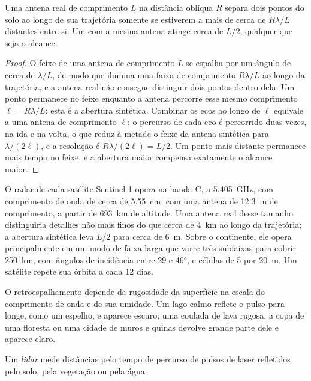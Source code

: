 \begin{proposition}\label{prop:b3:remote-sensing-gis:azimuth}
Uma antena real de comprimento $L$ na distância oblíqua $R$ separa dois pontos do
solo ao longo de sua trajetória somente se estiverem a mais de cerca de $R\lambda/L$
distantes entre si. Um  com a mesma antena atinge cerca de $L/2$,
qualquer que seja o alcance.
\end{proposition}

\begin{proof}
O feixe de uma antena de comprimento $L$ se espalha por um ângulo de cerca de
$\lambda/L$, de modo que ilumina uma faixa de comprimento $R\lambda/L$ ao longo da trajetória, e
a antena real não consegue distinguir dois pontos dentro dela. Um ponto permanece
no feixe enquanto a antena percorre esse mesmo comprimento $\ell = R\lambda/L$:
esta é a abertura sintética. Combinar os ecos ao longo de $\ell$ equivale
a uma antena de comprimento $\ell$; o percurso de cada eco é
percorrido duas vezes, na ida e na volta, o que reduz à metade o feixe da
antena sintética para $\lambda/(2\ell)$, e a resolução é $R\lambda/(2\ell) =
L/2$. Um ponto mais distante permanece mais tempo no feixe, e a abertura maior
compensa exatamente o alcance maior.
\end{proof}

O radar de cada satélite Sentinel-1 opera na banda C, a
\qty{5.405}{GHz}, com comprimento de onda de cerca de \qty{5.55}{cm}, com uma antena
de \qty{12.3}{m} de comprimento, a partir de \qty{693}{km} de altitude. Uma antena real desse tamanho distinguiria
detalhes não mais finos do que cerca de \qty{4}{km} ao longo da trajetória; a abertura sintética
leva $L/2$ para cerca de \qty{6}{m}. Sobre o continente, ele opera principalmente em um
modo de faixa larga que varre três subfaixas para cobrir \qty{250}{km}, com
ângulos de incidência entre 29 e \ang{46}, e células de 5 por \qty{20}{m}.
Um satélite repete sua órbita a cada 12 dias.

O retroespalhamento depende da rugosidade da superfície na escala do
comprimento de onda e de sua umidade. Um lago calmo reflete o pulso para longe, como um
espelho, e aparece escuro; uma coulada de lava rugosa, a copa de uma floresta ou uma cidade de muros
e quinas devolve grande parte dele e aparece claro.

\begin{definition}[Lidar]\label{def:b3:remote-sensing-gis:lidar}
Um \emph{lidar} mede distâncias pelo tempo de percurso de pulsos de laser
refletidos pelo solo, pela vegetação ou pela água.
\end{definition}

